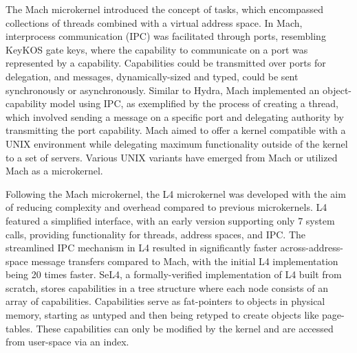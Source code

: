 The Mach microkernel introduced the concept of tasks, which encompassed collections of threads 
combined with a virtual address space. In Mach, interprocess communication (IPC) was facilitated through 
ports, resembling KeyKOS gate keys, where the capability to communicate on a port was represented by a 
capability. Capabilities could be transmitted over ports for delegation, and messages, dynamically-sized 
and typed, could be sent synchronously or asynchronously. Similar to Hydra, Mach implemented an object-capability 
model using IPC, as exemplified by the process of creating a thread, which involved sending a message on a specific 
port and delegating authority by transmitting the port capability. Mach aimed to offer a kernel compatible with a 
UNIX environment while delegating maximum functionality outside of the kernel to a set of servers. Various 
UNIX variants have emerged from Mach or utilized Mach as a microkernel.


Following the Mach microkernel, the L4 microkernel was developed with the aim of reducing complexity and 
overhead compared to previous microkernels. L4 featured a simplified interface, with an early version 
supporting only 7 system calls, providing functionality for threads, address spaces, and IPC. 
The streamlined IPC mechanism in L4 resulted in significantly faster across-address-space message transfers 
compared to Mach, with the initial L4 implementation being 20 times faster. SeL4, a formally-verified 
implementation of L4 built from scratch, stores capabilities in a tree structure where each node consists 
of an array of capabilities. Capabilities serve as fat-pointers to objects in physical memory, starting 
as untyped and then being retyped to create objects like page-tables. These capabilities can only be modified 
by the kernel and are accessed from user-space via an index.

